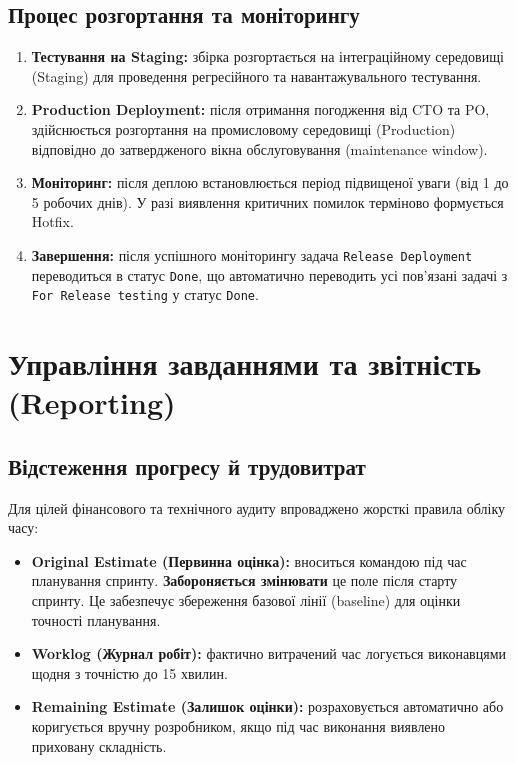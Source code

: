 \documentclass{article}
\begin{document}
\subsection{Процес розгортання та моніторингу}
\begin{enumerate}
    \item \textbf{Тестування на Staging:} збірка розгортається на інтеграційному середовищі (Staging) для проведення регресійного та навантажувального тестування.
    \item \textbf{Production Deployment:} після отримання погодження від CTO та PO, здійснюється розгортання на промисловому середовищі (Production) відповідно до затвердженого вікна обслуговування (maintenance window).
    \item \textbf{Моніторинг:} після деплою встановлюється період підвищеної уваги (від 1 до 5 робочих днів). У разі виявлення критичних помилок терміново формується Hotfix.
    \item \textbf{Завершення:} після успішного моніторингу задача \texttt{Release Deployment} переводиться в статус \texttt{Done}, що автоматично переводить усі пов'язані задачі з \texttt{For Release testing} у статус \texttt{Done}.
\end{enumerate}

\section{Управління завданнями та звітність (Reporting)}

\subsection{Відстеження прогресу й трудовитрат}
Для цілей фінансового та технічного аудиту впроваджено жорсткі правила обліку часу:
\begin{itemize}
    \item \textbf{Original Estimate (Первинна оцінка):} вноситься командою під час планування спринту. \textbf{Забороняється змінювати} це поле після старту спринту. Це забезпечує збереження базової лінії (baseline) для оцінки точності планування.
    \item \textbf{Worklog (Журнал робіт):} фактично витрачений час логується виконавцями щодня з точністю до 15 хвилин.
    \item \textbf{Remaining Estimate (Залишок оцінки):} розраховується автоматично або коригується вручну розробником, якщо під час виконання виявлено приховану складність.
\end{itemize}
\end{document}
